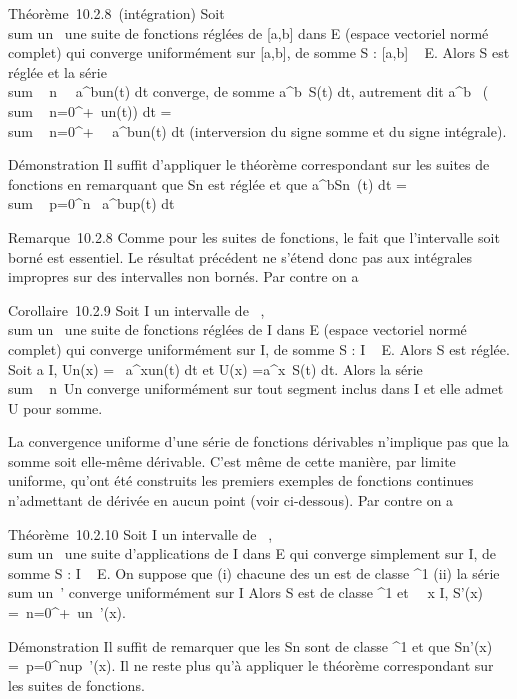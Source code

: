 Théorème~10.2.8~(intégration) Soit
\\sum  un~ une
suite de fonctions réglées de {[}a,b{]} dans E (espace vectoriel normé
complet) qui converge uniformément sur {[}a,b{]}, de somme S : {[}a,b{]}
\rightarrow~ E. Alors S est réglée et la série
\\sum ~
n\in{}~\int ~
a^bun(t) dt converge, de somme
\int  a^b~S(t) dt, autrement dit
\int  a^b~\left
(\\sum ~
n=0^+\infty~un(t)\right ) dt
= \\sum ~
n=0^+\infty~\int ~
a^bun(t) dt (interversion du signe somme et du
signe intégrale).

Démonstration Il suffit d'appliquer le théorème correspondant sur les
suites de fonctions en remarquant que Sn est réglée et que
\int  a^bSn~(t) dt
= \\sum ~
p=0^n\int ~
a^bup(t) dt

Remarque~10.2.8 Comme pour les suites de fonctions, le fait que
l'intervalle soit borné est essentiel. Le résultat précédent ne s'étend
donc pas aux intégrales impropres sur des intervalles non bornés. Par
contre on a

Corollaire~10.2.9 Soit I un intervalle de ~,
\\sum  un~ une
suite de fonctions réglées de I dans E (espace vectoriel normé complet)
qui converge uniformément sur I, de somme S : I \rightarrow~ E. Alors S est réglée.
Soit a \in I, Un(x) =\int ~
a^xun(t) dt et U(x)
=\int  a^x~S(t) dt. Alors la
série \\sum ~
n\in{}~Un converge uniformément sur tout segment inclus
dans I et elle admet U pour somme.

La convergence uniforme d'une série de fonctions dérivables n'implique
pas que la somme soit elle-même dérivable. C'est même de cette manière,
par limite uniforme, qu'ont été construits les premiers exemples de
fonctions continues n'admettant de dérivée en aucun point (voir
ci-dessous). Par contre on a

Théorème~10.2.10 Soit I un intervalle de ~,
\\sum  un~ une
suite d'applications de I dans E qui converge simplement sur I, de somme
S : I \rightarrow~ E. On suppose que (i) chacune des un est de classe
^1 (ii) la série
\\sum  un~'
converge uniformément sur I Alors S est de classe ^1 et
\forall~~x \in I, S'(x) =\
\sum  n=0^+\infty~un~'(x).

Démonstration Il suffit de remarquer que les Sn sont de classe
^1 et que Sn'(x) =\
\sum  p=0^nup~'(x). Il
ne reste plus qu'à appliquer le théorème correspondant sur les suites de
fonctions.

